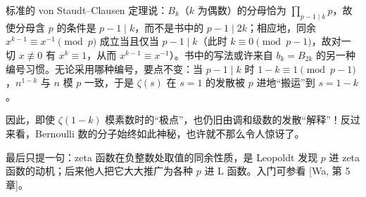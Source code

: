 \begin{annote}
标准的 von Staudt--Clausen 定理说：$B_k$（$k$ 为偶数）的分母恰为 $\prod_{p-1\mid k}p$，故使分母含 $p$ 的条件是 $p-1\mid k$，而不是书中的 $p-1\mid2k$；相应地，同余 $x^{k-1}\equiv x^{-1}\pmod p$ 成立当且仅当 $p-1\mid k$（此时 $k\equiv0\pmod{p-1}$，故对一切 $x\not\equiv0$ 有 $x^{k}\equiv1$，从而 $x^{k-1}\equiv x^{-1}$）。书中的写法或许来自 $b_k=B_{2k}$ 的另一种编号习惯。无论采用哪种编号，要点不变：当 $p-1\mid k$ 时 $1-k\equiv1\pmod{p-1}$，$n^{1-k}$ 与 $n$ 模 $p$ 一致，于是 $\zeta(s)$ 在 $s=1$ 的发散被 $p$ 进地“搬运”到 $s=1-k$。
\par\vspace{0.15em}{\raggedleft 【来源：Ireland--Rosen《A Classical Introduction to Modern Number Theory》Ch.~15（A）；Washington《Introduction to Cyclotomic Fields》Ch.~5（A）】\par}
\end{annote}

因此，即使 $\zeta(1-k)$ 模素数时的“极点”，也仍旧由调和级数的发散“解释”！反过来看，Bernoulli 数的分子始终如此神秘，也许就不那么令人惊讶了。

最后只提一句：zeta 函数在负整数处取值的同余性质，是 Leopoldt 发现 $p$ 进 zeta 函数的动机；后来他人把它大大推广为各种 $p$ 进 L 函数。入门可参看 [Wa, 第 5 章]。

